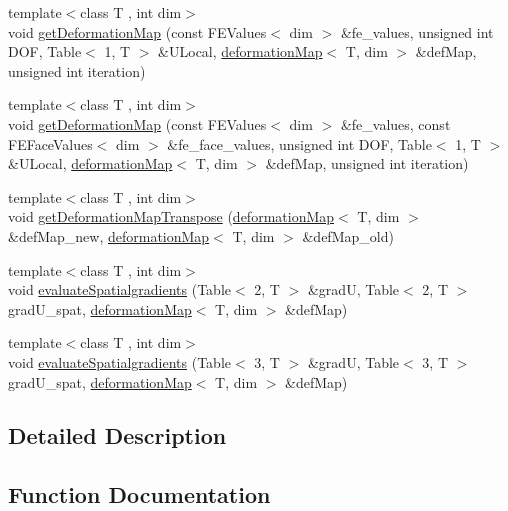 \begin{DoxyCompactItemize}
\item 
{\footnotesize template$<$class T , int dim$>$ }\\void \hyperlink{group___evaluation_functions_ga62b026b5bcee0bda21159ff6782b4b59}{get\-Deformation\-Map} (const F\-E\-Values$<$ dim $>$ \&fe\-\_\-values, unsigned int D\-O\-F, Table$<$ 1, T $>$ \&U\-Local, \hyperlink{structdeformation_map}{deformation\-Map}$<$ T, dim $>$ \&def\-Map, unsigned int iteration)
\item 
{\footnotesize template$<$class T , int dim$>$ }\\void \hyperlink{group___evaluation_functions_ga239b206235603af9482484c29c8d57ea}{get\-Deformation\-Map} (const F\-E\-Values$<$ dim $>$ \&fe\-\_\-values, const F\-E\-Face\-Values$<$ dim $>$ \&fe\-\_\-face\-\_\-values, unsigned int D\-O\-F, Table$<$ 1, T $>$ \&U\-Local, \hyperlink{structdeformation_map}{deformation\-Map}$<$ T, dim $>$ \&def\-Map, unsigned int iteration)
\item 
{\footnotesize template$<$class T , int dim$>$ }\\void \hyperlink{group___evaluation_functions_gad4003712a2346a79e13bdbfcad4d1e1c}{get\-Deformation\-Map\-Transpose} (\hyperlink{structdeformation_map}{deformation\-Map}$<$ T, dim $>$ \&def\-Map\-\_\-new, \hyperlink{structdeformation_map}{deformation\-Map}$<$ T, dim $>$ \&def\-Map\-\_\-old)
\item 
{\footnotesize template$<$class T , int dim$>$ }\\void \hyperlink{group___evaluation_functions_gadb862d9530a60b8ce5255222778ceeb6}{evaluate\-Spatialgradients} (Table$<$ 2, T $>$ \&grad\-U, Table$<$ 2, T $>$ grad\-U\-\_\-spat, \hyperlink{structdeformation_map}{deformation\-Map}$<$ T, dim $>$ \&def\-Map)
\item 
{\footnotesize template$<$class T , int dim$>$ }\\void \hyperlink{group___evaluation_functions_ga0b976342d491f6215953e2e65ea6a0de}{evaluate\-Spatialgradients} (Table$<$ 3, T $>$ \&grad\-U, Table$<$ 3, T $>$ grad\-U\-\_\-spat, \hyperlink{structdeformation_map}{deformation\-Map}$<$ T, dim $>$ \&def\-Map)
\end{DoxyCompactItemize}


\subsection{Detailed Description}


\subsection{Function Documentation}
